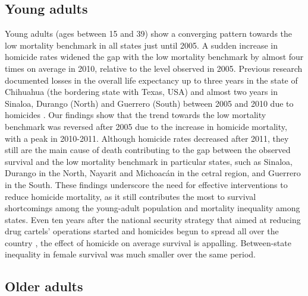 \documentclass{bmcart}
\begin{document}
\subsection*{Young adults}

Young adults (ages between 15 and 39) show a converging pattern towards the low mortality benchmark in all states just until 2005. A sudden increase in homicide rates widened the gap with the low mortality benchmark by almost four times on average in 2010, relative to the level observed in 2005. Previous research documented losses in the overall life expectancy up to three years in the state of Chihuahua (the bordering state with Texas, USA) and almost two years in Sinaloa, Durango (North) and Guerrero (South) between 2005 and 2010 due to homicides \cite{Aburto2015}. Our findings show that the trend towards the low mortality benchmark was reversed after 2005 due to the increase in homicide mortality, with a peak in 2010-2011. Although homicide rates decreased after 2011, they still are the main cause of death contributing to the gap between the observed survival and the low mortality benchmark in particular states, such as Sinaloa, Durango in the North, Nayarit and Michoac\'an in the cetral region, and Guerrero in the South. These findings underscore the need for effective interventions to reduce homicide mortality, as it still contributes the most to survival shortcomings among the young-adult population and mortality inequality among states. Even ten years after the national security strategy that aimed at reducing drug cartels' operations started and homicides begun to spread all over the country \cite{espinal2015analysis}, the effect of homicide on average survival is appalling. Between-state inequality in female survival was much smaller over the same period.


\subsection*{Older adults}

\end{document}
